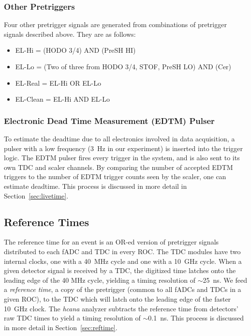 \subsubsection{Other Pretriggers}
Four other pretrigger signals are generated from combinations of pretrigger
signals described above.
They are as follows:

\begin{itemize}
    \item EL-Hi = (HODO 3/4) AND (PreSH HI)
    \item EL-Lo = (Two of three from {HODO 3/4, STOF, PreSH LO}) AND (Cer)
    \item EL-Real = EL-Hi OR EL-Lo
    \item EL-Clean = EL-Hi AND EL-Lo
\end{itemize}

\subsubsection{Electronic Dead Time Measurement (EDTM) Pulser}
\label{sec:edtm}
To estimate the deadtime due to all electronics involved in data acquisition, a
pulser with a low frequency (\SI{3}{\hertz} in our experiment) is inserted into the
trigger logic.
The EDTM pulser fires every trigger in the system, and is also sent to its own
TDC and scaler channels.
By comparing the number of accepted EDTM triggers to the number of EDTM trigger
counts seen by the scaler, one can estimate deadtime.
This process is discussed in more detail in Section~\ref{sec:livetime}.

\subsection{Reference Times}
The reference time for an event is an OR-ed version of pretrigger signals
distributed to each fADC and TDC in every ROC.
The TDC modules have two internal clocks, one with a \SI{40}{MHz} cycle and one
with a \SI{10}{GHz} cycle.
When a given detector signal is received by a TDC, the digitized time latches
onto the leading edge of the 40 MHz cycle, yielding a timing resolution of
$\sim$\SI{25}{ns}.
We feed a \textit{reference time}, a copy of the pretrigger (common to all
fADCs and TDCs in a given ROC), to the TDC which will latch onto the leading
edge of the faster \SI{10}{GHz} clock.
The \textit{hcana} analyzer subtracts the reference time from detectors' raw
TDC times to yield a timing resolution of $\sim$\SI{0.1}{ns}.
This process is discussed in more detail in Section~\ref{sec:reftime}.
